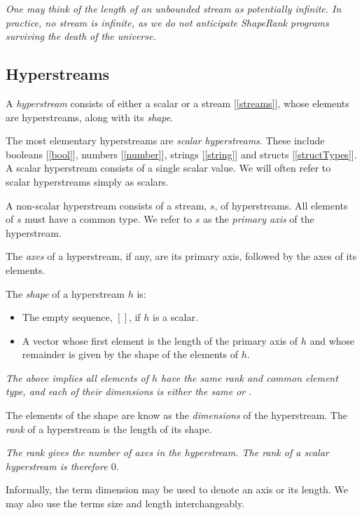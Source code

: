 \documentclass{article}
\begin{document}
{\em One may think of the length of an unbounded stream as potentially infinite. In practice, no stream is infinite, as we do not anticipate ShapeRank programs surviving the death of the universe.
}

\subsection{Hyperstreams}
\label{hyperstreams}

A {\em hyperstream} consists of either a scalar or a stream [\ref{streams}], whose elements are hyperstreams, along with 
 its  {\em shape}. 

The most elementary hyperstreams are {\em scalar hyperstreams}. These include  booleans [\ref{bool}], numbers [\ref{number}], strings [\ref{string}] and  structs [\ref{structTypes}]. A scalar hyperstream consists of a single scalar value.  We will often refer to scalar hyperstreams simply as scalars.

A non-scalar hyperstream consists of a stream, $s$, of hyperstreams. All elements of $s$ must have a common type.
We refer to $s$ as the {\em primary axis} of the hyperstream.

The {\em axes} of a hyperstream, if any, are its primary axis, followed by the axes of its elements. 

The {\em shape} of a hyperstream $h$ is:
\begin{itemize}
\item  The empty sequence, $[]$, if  $h$ is a scalar. 
\item A vector whose first element is the length of the primary axis of $h$ and whose remainder is given by the shape of the elements of $h$. 
\end{itemize}

{\em The above implies all elements of $h$ have the same rank and common element type, and each of their dimensions is either the same or \QUESTIONMARK}.
 
The elements of the shape are know as  the {\em dimensions} of the hyperstream.
 The {\em rank} of a hyperstream is the length of its shape.

{\em
The rank  gives the number of axes in the hyperstream. The rank of a scalar hyperstream is therefore $0$.
}

Informally, the term dimension may be used to denote an axis or its length. We may also use the terms size and length interchangeably.
\end{document}
